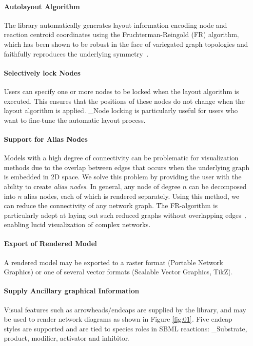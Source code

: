 \documentclass{bioinfo}
\begin{document}
\paragraph{Autolayout Algorithm}
The library automatically generates layout information encoding node and reaction centroid coordinates using the Fruch\-terman-Reingold (FR) algorithm, which has been shown to be robust in the face of variegated graph topologies and faithfully reproduces the underlying symm\-etry~\citep{FruchtermanReingold}. 

\paragraph{Selectively lock Nodes} Users can specify one or more nodes to be locked when the layout algorithm is executed. This ensures that the positions of these nodes do not change when the layout algorithm is applied.
_Node locking is particularly useful for users who want to fine-tune the automatic layout process.

\paragraph{Support for Alias Nodes}
Models with a high degree of connectivity can be problematic for visualization
methods due to the overlap between edges that occurs when the underlying 
graph is embedded in 2D space.
We solve this problem by providing the user
with the ability to create \textit{alias nodes}. In general, any node of degree
$n$ can be decomposed into $n$ alias nodes, each of which is rendered separately.
Using this method, we can reduce the connectivity of any network graph.
The FR-algorithm is particularly adept at laying out such reduced graphs without overlapping edges~\citep{FruchtermanReingold}, 
enabling lucid visualization of complex networks.

\paragraph{Export of Rendered Model}
A rendered model may be exported to a raster format (Portable Network Graphics) or one of several vector formats (Scalable Vector Graphics, TikZ). 

\paragraph{Supply Ancillary graphical Information}
Visual features such as arrowheads/endcaps are supplied by the library, and may be used to render network diagrams as shown in Figure \ref{fig:01}. Five endcap styles are supported and are tied to species roles in SBML reactions: _Substrate, product, modifier, activator and inhibitor.
\end{document}
